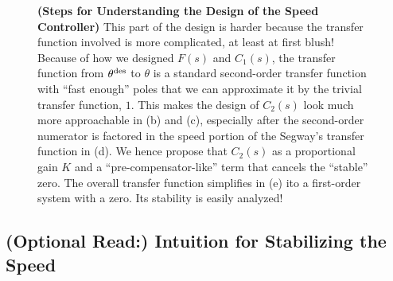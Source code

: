 \begin{figure}[h]
{
}
    \caption{\textbf{(Steps for Understanding the Design of the Speed Controller)} This part of the design is harder because the transfer function involved is more complicated, at least at first blush! Because of how we designed $F(s)$ and $C_1(s)$, the transfer function from $\theta^{\rm des}$ to $\theta$ is a standard second-order transfer function with ``fast enough'' poles that we can approximate it by the trivial transfer function, $1$. This makes the design of $C_2(s)$ look much more approachable in (b) and (c), especially after the second-order numerator is factored in the speed portion of the Segway's transfer function in (d). We hence propose that $C_2(s)$ as a proportional gain $K$ and a ``pre-compensator-like'' term that cancels the ``stable'' zero. The overall transfer function simplifies in (e) ito a first-order system with a zero. Its stability is easily analyzed!
    }    
    \label{fig:SpeedControlWhatWeNeedToDo}
\end{figure} 




\subsection*{\textbf{(Optional Read:) Intuition for Stabilizing the Speed}}

